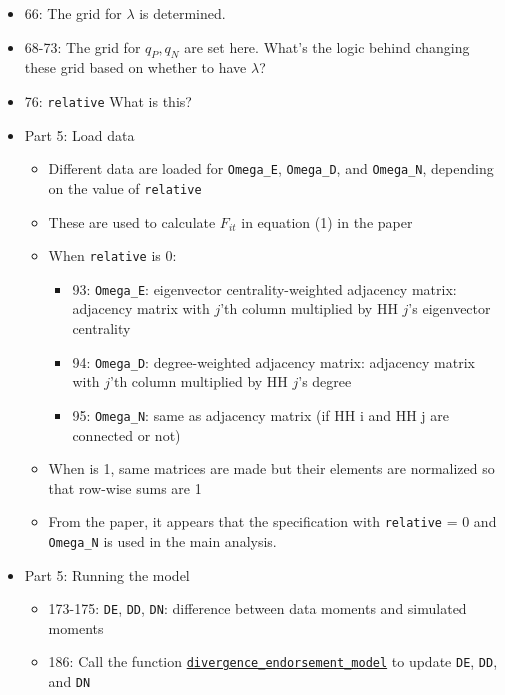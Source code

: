 \documentclass[10pt,letterpaper]{article}
\begin{document}
\begin{itemize}
	\item 66: The grid for $\lambda$ is determined. 
	\item 68-73: The grid for $q_P, q_N$ are set here. What's the logic behind changing these grid based on whether to have $\lambda$?
  \item 76: \texttt{relative} What is this?
  \item Part 5: Load data
    \begin{itemize}
      \item Different data are loaded for \texttt{Omega\_E}, \texttt{Omega\_D}, and \texttt{Omega\_N}, depending on the value of \texttt{relative}
      \item These are used to calculate $F_{it}$ in equation (1) in the paper
      \item When \texttt{relative} is 0:
        \begin{itemize}
          \item 93: \texttt{Omega\_E}: eigenvector centrality-weighted adjacency matrix: adjacency matrix with $j$'th column multiplied by HH $j$'s eigenvector centrality
          \item 94: \texttt{Omega\_D}: degree-weighted adjacency matrix: adjacency matrix with $j$'th column multiplied by HH $j$'s degree
          \item 95: \texttt{Omega\_N}: same as adjacency matrix (if HH i and HH j are connected or not)
        \end{itemize}
      \item When  is 1, same matrices are made but their elements are normalized so that row-wise sums are 1
      \item From the paper, it appears that the specification with \texttt{relative} = 0 and \texttt{Omega\_N} is used in the main analysis.
    \end{itemize}
  \item Part 5: Running the model
    \begin{itemize}
      \item 173-175: \texttt{DE}, \texttt{DD}, \texttt{DN}: difference between data moments and simulated moments
      \item 186: Call the function \hyperref[divergence_endorsement_model]{\texttt{divergence\_endorsement\_model}} to update \texttt{DE}, \texttt{DD}, and \texttt{DN}
    \end{itemize}
\end{itemize}
\end{document}
